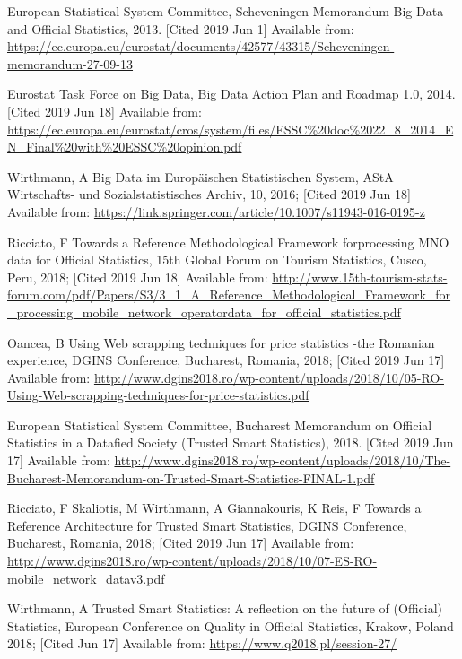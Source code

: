 \documentclass[]{article}
\begin{document}
\begin{thebibliography}{99}
	

European Statistical System Committee, Scheveningen Memorandum Big Data and Official Statistics, 2013. [Cited 2019 Jun 1]
Available from: \url{https://ec.europa.eu/eurostat/documents/42577/43315/Scheveningen-memorandum-27-09-13}

Eurostat Task Force on Big Data, Big Data Action Plan and Roadmap 1.0, 2014. [Cited 2019 Jun 18]
Available from:
\url{https://ec.europa.eu/eurostat/cros/system/files/ESSC%20doc%2022_8_2014_EN_Final%20with%20ESSC%20opinion.pdf} 
	
Wirthmann, A Big Data im Europäischen Statistischen System, AStA Wirtschafts- und Sozialstatistisches Archiv, 10, 2016; [Cited 2019 Jun 18]
Available from:
\url{https://link.springer.com/article/10.1007/s11943-016-0195-z}

Ricciato, F Towards a Reference Methodological Framework forprocessing MNO data for Official Statistics, 15th Global Forum on Tourism Statistics, Cusco, Peru, 2018; [Cited 2019 Jun 18]
Available from:
\url{http://www.15th-tourism-stats-forum.com/pdf/Papers/S3/3_1_A_Reference_Methodological_Framework_for_processing_mobile_network_operatordata_for_official_statistics.pdf}

Oancea, B Using Web scrapping techniques for price statistics -the Romanian experience, DGINS Conference, Bucharest, Romania, 2018; [Cited 2019 Jun 17]
Available from:
\url{http://www.dgins2018.ro/wp-content/uploads/2018/10/05-RO-Using-Web-scrapping-techniques-for-price-statistics.pdf} 

European Statistical System Committee,  Bucharest Memorandum on Official Statistics in a Datafied Society (Trusted Smart Statistics), 2018. [Cited 2019 Jun 17]
Available from: \url{http://www.dgins2018.ro/wp-content/uploads/2018/10/The-Bucharest-Memorandum-on-Trusted-Smart-Statistics-FINAL-1.pdf}

Ricciato, F Skaliotis, M Wirthmann, A Giannakouris, K Reis, F Towards a Reference Architecture for Trusted Smart Statistics, DGINS Conference, Bucharest, Romania, 2018; [Cited 2019 Jun 17]
Available from:
\url{http://www.dgins2018.ro/wp-content/uploads/2018/10/07-ES-RO-mobile_network_datav3.pdf}

Wirthmann, A Trusted Smart Statistics: A reflection on the future of (Official) Statistics, European Conference on Quality in Official Statistics, Krakow, Poland 2018; [Cited Jun 17]
Available from:
\url{https://www.q2018.pl/session-27/}


\end{thebibliography}
\end{document}
